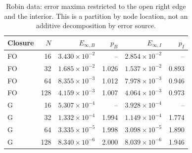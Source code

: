 \begin{table}[htbp]
\centering
\small
\setlength{\tabcolsep}{4pt}
\begin{tabular}{lrrrrr}
\toprule
Closure & $N$ & $E_{\infty,B}$ & $p_B$ & $E_{\infty,I}$ & $p_I$ \\
\midrule
FO & 16 & $3.430\times10^{-2}$ & -- & $2.854\times10^{-2}$ & -- \\
FO & 32 & $1.685\times10^{-2}$ & 1.026 & $1.537\times10^{-2}$ & 0.893 \\
FO & 64 & $8.355\times10^{-3}$ & 1.012 & $7.978\times10^{-3}$ & 0.946 \\
FO & 128 & $4.159\times10^{-3}$ & 1.007 & $4.064\times10^{-3}$ & 0.973 \\
G & 16 & $5.307\times10^{-4}$ & -- & $3.928\times10^{-4}$ & -- \\
G & 32 & $1.332\times10^{-4}$ & 1.994 & $1.149\times10^{-4}$ & 1.774 \\
G & 64 & $3.335\times10^{-5}$ & 1.998 & $3.098\times10^{-5}$ & 1.890 \\
G & 128 & $8.340\times10^{-6}$ & 2.000 & $8.039\times10^{-6}$ & 1.946 \\
\bottomrule
\end{tabular}
\caption{Robin data: error maxima restricted to the open right edge and the interior. This is a partition by node location, not an additive decomposition by error source.}
\label{tab:spatial-robin}
\end{table}
